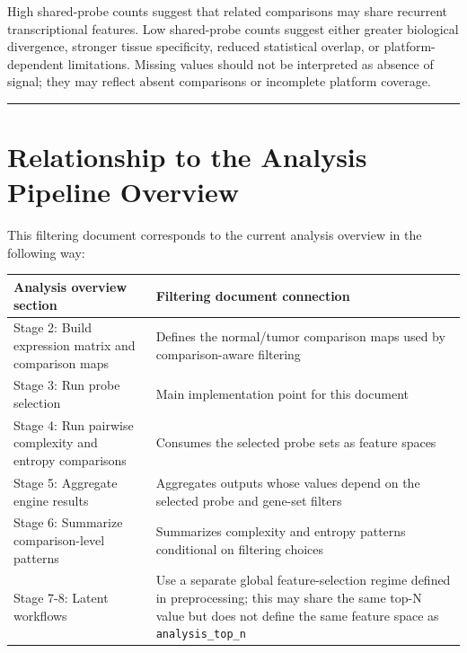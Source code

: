 \documentclass[
  letterpaper,
  DIV=11,
  numbers=noendperiod,
  openany,
  oneside]{scrreprt}
\begin{document}
High shared-probe counts suggest that related comparisons may share
recurrent transcriptional features. Low shared-probe counts suggest
either greater biological divergence, stronger tissue specificity,
reduced statistical overlap, or platform-dependent limitations. Missing
values should not be interpreted as absence of signal; they may reflect
absent comparisons or incomplete platform coverage.

\begin{center}\rule{0.5\linewidth}{0.5pt}\end{center}

\section{Relationship to the Analysis Pipeline
Overview}\label{relationship-to-the-analysis-pipeline-overview}

This filtering document corresponds to the current analysis overview in
the following way:

\begin{longtable}[]{@{}
  >{\raggedright\arraybackslash}p{}
  >{\raggedright\arraybackslash}p{}@{}}
\toprule\noalign{}
\begin{minipage}[b]{\linewidth}\raggedright
Analysis overview section
\end{minipage} & \begin{minipage}[b]{\linewidth}\raggedright
Filtering document connection
\end{minipage} \\
\midrule\noalign{}
\endhead
\bottomrule\noalign{}
\endlastfoot
Stage 2: Build expression matrix and comparison maps & Defines the
normal/tumor comparison maps used by comparison-aware filtering \\
Stage 3: Run probe selection & Main implementation point for this
document \\
Stage 4: Run pairwise complexity and entropy comparisons & Consumes the
selected probe sets as feature spaces \\
Stage 5: Aggregate engine results & Aggregates outputs whose values
depend on the selected probe and gene-set filters \\
Stage 6: Summarize comparison-level patterns & Summarizes complexity and
entropy patterns conditional on filtering choices \\
Stage 7-8: Latent workflows & Use a separate global feature-selection
regime defined in preprocessing; this may share the same top-N value but
does not define the same feature space as \texttt{analysis\_top\_n} \\
\end{longtable}
\end{document}
